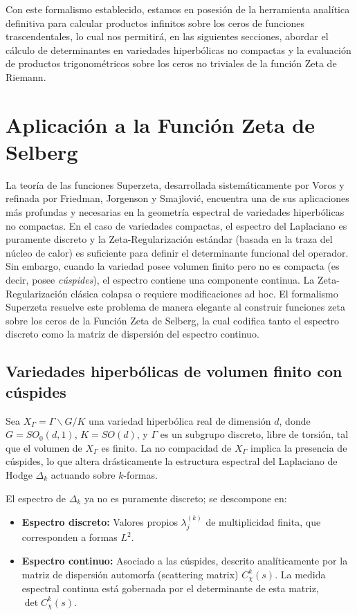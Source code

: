 Con este formalismo establecido, estamos en posesión de la herramienta analítica definitiva para calcular productos infinitos sobre los ceros de funciones trascendentales, lo cual nos permitirá, en las siguientes secciones, abordar el cálculo de determinantes en variedades hiperbólicas no compactas y la evaluación de productos trigonométricos sobre los ceros no triviales de la función Zeta de Riemann.


\section{Aplicación a la Función Zeta de Selberg}

La teoría de las funciones Superzeta, desarrollada sistemáticamente por Voros y refinada por Friedman, Jorgenson y Smajlović, encuentra una de sus aplicaciones más profundas y necesarias en la geometría espectral de variedades hiperbólicas no compactas. En el caso de variedades compactas, el espectro del Laplaciano es puramente discreto y la Zeta-Regularización estándar (basada en la traza del núcleo de calor) es suficiente para definir el determinante funcional del operador. Sin embargo, cuando la variedad posee volumen finito pero no es compacta (es decir, posee \textit{cúspides}), el espectro contiene una componente continua. La Zeta-Regularización clásica colapsa o requiere modificaciones ad hoc. El formalismo Superzeta resuelve este problema de manera elegante al construir funciones zeta sobre los ceros de la Función Zeta de Selberg, la cual codifica tanto el espectro discreto como la matriz de dispersión del espectro continuo.

\subsection{Variedades hiperbólicas de volumen finito con cúspides}

Sea $X_\Gamma = \Gamma \backslash G / K$ una variedad hiperbólica real de dimensión $d$, donde $G = SO_0(d,1)$, $K = SO(d)$, y $\Gamma$ es un subgrupo discreto, libre de torsión, tal que el volumen de $X_\Gamma$ es finito. La no compacidad de $X_\Gamma$ implica la presencia de cúspides, lo que altera drásticamente la estructura espectral del Laplaciano de Hodge $\Delta_k$ actuando sobre $k$-formas.

El espectro de $\Delta_k$ ya no es puramente discreto; se descompone en:
\begin{itemize}
    \item \textbf{Espectro discreto:} Valores propios $\lambda_j^{(k)}$ de multiplicidad finita, que corresponden a formas $L^2$.
    \item \textbf{Espectro continuo:} Asociado a las cúspides, descrito analíticamente por la matriz de dispersión automorfa (scattering matrix) $C_\chi^k(s)$. La medida espectral continua está gobernada por el determinante de esta matriz, $\det C_\chi^k(s)$.
\end{itemize}


